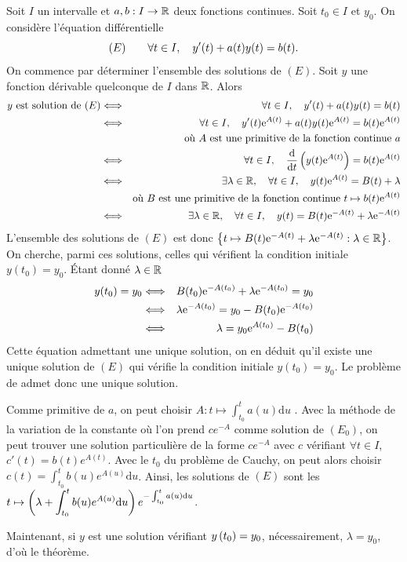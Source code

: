 \documentclass{magnoliaold}
\begin{document}
\begin{preuve}
\begin{francois}
Soit $I$ un intervalle et $a,b:I\to\mathbb{R}$ deux fonctions continues. Soit $t_0\in I$ et $y_0$. On considère l'équation différentielle
\[(E)\qquad\forall t\in I,\quad y'(t)+a(t)y(t)=b(t).\]
On commence par déterminer l'ensemble des solutions de $(E)$. Soit $y$ une fonction dérivable quelconque de $I$ dans $\mathbb{R}$. Alors
\begin{eqnarray*}
\text{$y$ est solution de $(E)$}
&\Longleftrightarrow& \forall t\in I,\quad y'(t)+a(t)y(t)=b(t)\\
&\Longleftrightarrow& \forall t\in I,\quad y'(t){\rm e}^{A(t)}+a(t)y(t){\rm e}^{A(t)}=b(t){\rm e}^{A(t)}\\
&    & \text{où $A$ est une primitive de la fonction continue $a$}\\
&\Longleftrightarrow& \forall t\in I,\quad \frac{{\rm d}}{{\rm d}t}\left(y(t){\rm e}^{A(t)}\right)=b(t){\rm e}^{A(t)}\\
&\Longleftrightarrow& \exists\lambda\in\mathbb{R},\quad \forall t\in I,\quad y(t){\rm e}^{A(t)}=B(t)+\lambda\\
&    & \text{où $B$ est une primitive de la fonction continue $t\mapsto b(t){\rm e}^{A(t)}$}\\
&\Longleftrightarrow& \exists\lambda\in\mathbb{R},\quad \forall t\in I,\quad y(t)=B(t){\rm e}^{-A(t)}+\lambda{\rm e}^{-A(t)}
\end{eqnarray*}
L'ensemble des solutions de $(E)$ est donc $\left\{t\mapsto B(t){\rm e}^{-A(t)}+\lambda{\rm e}^{-A(t)} : \lambda\in\mathbb{R}\right\}$. On cherche, parmi ces solutions, celles qui vérifient la condition initiale $y(t_0)=y_0$. Étant donné $\lambda\in\mathbb{R}$
\begin{eqnarray*}
y(t_0)=y_0
&\Longleftrightarrow& B(t_0){\rm e}^{-A(t_0)}+\lambda{\rm e}^{-A(t_0)}=y_0\\
&\Longleftrightarrow& \lambda{\rm e}^{-A(t_0)}=y_0-B(t_0){\rm e}^{-A(t_0)}\\
&\Longleftrightarrow& \lambda=y_0{\rm e}^{A(t_0)}-B(t_0)
\end{eqnarray*}
Cette équation admettant une unique solution, on en déduit qu'il existe une unique solution de $(E)$ qui vérifie la condition initiale $y(t_0)=y_0$. Le problème de  admet donc une unique solution.
\end{francois}
\begin{victor}
Comme primitive de $a$, on peut choisir $A:t\mapsto \displaystyle \int_{t_0}^t a(u)\mathrm{d}u$ . Avec la méthode de la variation de la constante où l'on prend $ce^{-A}$ comme solution de $(E_0)$, on peut trouver une solution particulière de la forme $ce^{-A}$ avec $c$ vérifiant $\forall t \in I$, $c'(t)=b(t)e^{A(t)}$. Avec le $t_0$ du problème de Cauchy, on peut alors choisir $c(t)=\displaystyle \int_{t_0}^t b(u)e^{A(u)} \mathrm{d} u$. Ainsi, les solutions de $(E)$ sont les $t\mapsto \left(\lambda+\displaystyle \int_{t_0}^t b(u)e^{A(u)} \mathrm{d} u\right)e^{-\int_{t_0}^t a(u)\mathrm{d}u}$.

Maintenant, si $y$ est une solution vérifiant $y\left(t_0\right)=y_0$, nécessairement, $\lambda=y_0$, d'où le théorème.
\end{victor}
\end{preuve}
\end{document}
